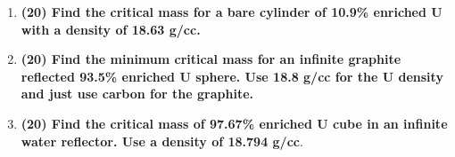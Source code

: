 \documentclass[11pt,a4paper]{article}
\begin{document}
\begin{enumerate}[leftmargin=*,topsep=0pt,font=\bfseries]
        \newpage 
    \item\textbf{(20) Find the critical mass for a bare cylinder of 10.9\% enriched U with a density of 18.63 g/cc.}
        \vspace{0.25in}\\
































        \newpage 
    \item\textbf{(20) Find the minimum critical mass for an infinite graphite reflected 93.5\% enriched U sphere. Use 18.8 g/cc for the U density and just use carbon for the graphite.}
        \vspace{0.25in}\\





























        \newpage 
    \item\textbf{(20) Find the critical mass of 97.67\% enriched U cube in an infinite water reflector. Use a density of 18.794 g/cc}.
        \vspace{0.25in}\\






















\end{enumerate}

\newpage


\newpage


\newpage


\setlength{\bibhang}{0pt}

\end{document}
